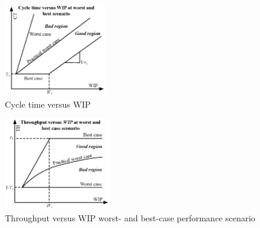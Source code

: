 \documentclass{article}
\begin{document}
\begin{figure}[htbp]
\centering
\includegraphics[height=150]{Figures/Cycle_time_versus_WIP.eps}
\caption{\label{fig:orga6be94c}Cycle time versus WIP}
\end{figure}


\begin{figure}[htbp]
\centering
\includegraphics[height=150]{Figures/Throughput_versus_WIP.eps}
\caption{\label{fig:orgba9ce4d}Throughput versus WIP worst- and best-case performance scenario}
\end{figure}
\end{document}
